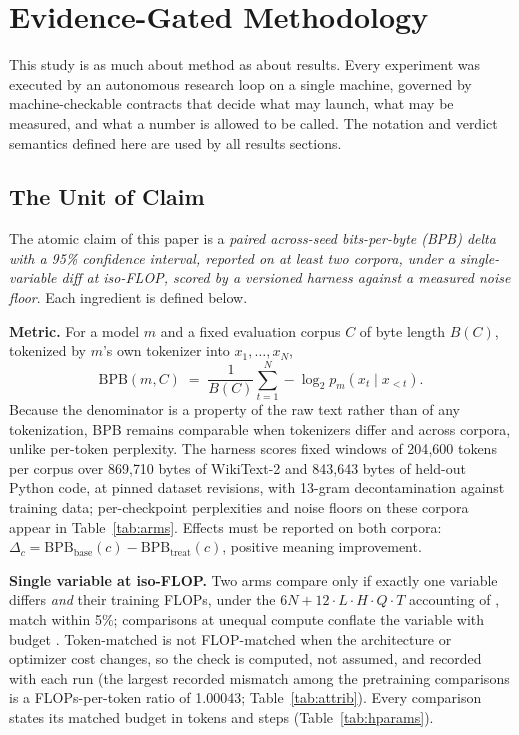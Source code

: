 \section{Evidence-Gated Methodology}\label{sec:method}

This study is as much about method as about results. Every experiment was
executed by an autonomous research loop on a single machine, governed by
machine-checkable contracts that decide what may launch, what may be measured,
and what a number is allowed to be called. The notation and verdict semantics
defined here are used by all results sections.

\subsection{The Unit of Claim}

The atomic claim of this paper is a \emph{paired across-seed bits-per-byte
(BPB) delta with a 95\% confidence interval, reported on at least two corpora,
under a single-variable diff at iso-FLOP, scored by a versioned harness against
a measured noise floor}. Each ingredient is defined below.

\textbf{Metric.} For a model $m$ and a fixed evaluation corpus $C$ of byte
length $B(C)$, tokenized by $m$'s own tokenizer into $x_1,\dots,x_N$,
\begin{equation}
\mathrm{BPB}(m,C) \;=\; \frac{1}{B(C)} \sum_{t=1}^{N} -\log_2 p_m\!\left(x_t \mid x_{<t}\right).
\end{equation}
Because the denominator is a property of the raw text rather than of any
tokenization, BPB remains comparable when tokenizers differ and across corpora,
unlike per-token perplexity. The harness scores fixed windows of 204{,}600
tokens per corpus over 869{,}710 bytes of WikiText-2 and 843{,}643 bytes of
held-out Python code, at pinned dataset revisions, with 13-gram decontamination
against training data; per-checkpoint perplexities and noise floors on these
corpora appear in Table~\ref{tab:arms}. Effects must be reported on both
corpora: $\Delta_c = \mathrm{BPB}_{\mathrm{base}}(c) -
\mathrm{BPB}_{\mathrm{treat}}(c)$, positive meaning improvement.

\textbf{Single variable at iso-FLOP.} Two arms compare only if exactly one
variable differs \emph{and} their training FLOPs, under the
$6N + 12 \cdot L \cdot H \cdot Q \cdot T$ accounting of \citet{chowdhery2022palm},
match within 5\%; comparisons at unequal compute conflate the variable with
budget \citep{hoffmann2022training}. Token-matched is not FLOP-matched when the
architecture or optimizer cost changes, so the check is computed, not assumed,
and recorded with each run (the largest recorded mismatch among the pretraining
comparisons is a FLOPs-per-token ratio of 1.00043; Table~\ref{tab:attrib}).
Every comparison states its matched budget in tokens and steps
(Table~\ref{tab:hparams}).

